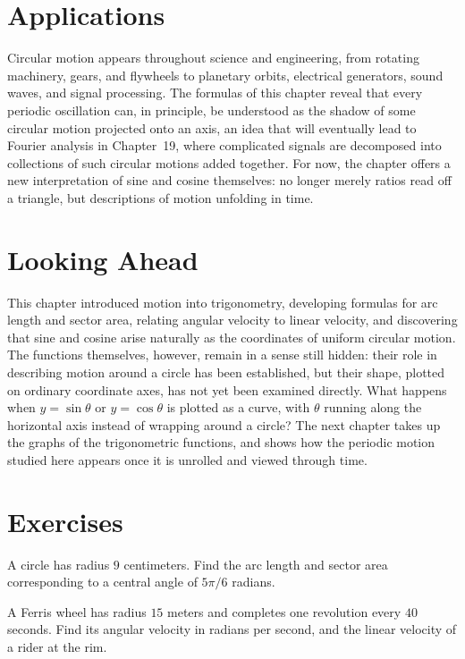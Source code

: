 \section{Applications}

Circular motion appears throughout science and engineering, from rotating
machinery, gears, and flywheels to planetary orbits, electrical generators,
sound waves, and signal processing. The formulas of this chapter reveal
that every periodic oscillation can, in principle, be understood as the
shadow of some circular motion projected onto an axis, an idea that will
eventually lead to Fourier analysis in Chapter~19, where complicated
signals are decomposed into collections of such circular motions added
together. For now, the chapter offers a new interpretation of sine and
cosine themselves: no longer merely ratios read off a triangle, but
descriptions of motion unfolding in time.

\section{Looking Ahead}

This chapter introduced motion into trigonometry, developing formulas for
arc length and sector area, relating angular velocity to linear velocity,
and discovering that sine and cosine arise naturally as the coordinates of
uniform circular motion. The functions themselves, however, remain in a
sense still hidden: their role in describing motion around a circle has
been established, but their shape, plotted on ordinary coordinate axes, has
not yet been examined directly. What happens when $y = \sin\theta$ or $y =
\cos\theta$ is plotted as a curve, with $\theta$ running along the
horizontal axis instead of wrapping around a circle? The next chapter takes
up the graphs of the trigonometric functions, and shows how the periodic
motion studied here appears once it is unrolled and viewed through time.

\section{Exercises}
\begin{exercise}
A circle has radius $9$ centimeters. Find the arc length and sector area
corresponding to a central angle of $5\pi/6$ radians.
\end{exercise}

\begin{exercise}
A Ferris wheel has radius $15$ meters and completes one revolution every
$40$ seconds. Find its angular velocity in radians per second, and the
linear velocity of a rider at the rim.
\end{exercise}


